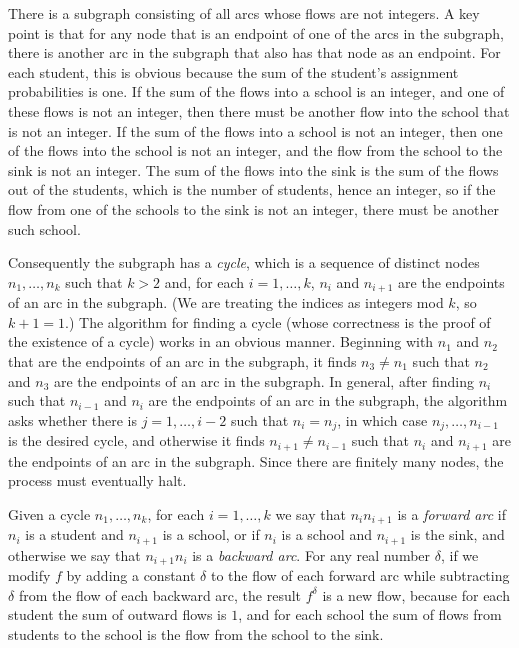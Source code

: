 \documentclass[12pt]{article}
\theoremstyle{definition}
\begin{document}
There is a subgraph consisting of all arcs whose flows are not
integers.  A key point is that for any node that is an endpoint of one
of the arcs in the subgraph, there is another arc in the subgraph
that also has that node as an endpoint.  For each student, this is
obvious because the sum of the student's assignment probabilities is
one.  If the sum of the flows into a school is an integer, and one of
these flows is not an integer, then there must be another flow into
the school that is not an integer.  If the sum of the flows into a
school is not an integer, then one of the flows into the school is not
an integer, and the flow from the school to the sink is not an
integer.  The sum of the flows into the sink is the sum of the flows
out of the students, which is the number of students, hence an
integer, so if the flow from one of the schools to the sink is not an
integer, there must be another such school.

Consequently the subgraph has a \emph{cycle}, which is a sequence of
distinct nodes $n_1, \ldots, n_k$ such that $k > 2$ and, for each $i =
1, \ldots, k$, $n_i$ and $n_{i+1}$ are the endpoints of an arc in the
subgraph.  (We are treating the indices as integers mod $k$, so $k + 1
= 1$.)  The algorithm for finding a cycle (whose correctness is the
proof of the existence of a cycle) works in an obvious manner.
Beginning with $n_1$ and $n_2$ that are the endpoints of an arc in the
subgraph, it finds $n_3 \ne n_1$ such that $n_2$ and $n_3$ are the
endpoints of an arc in the subgraph.  In general, after finding $n_i$
such that $n_{i-1}$ and $n_i$ are the endpoints of an arc in the
subgraph, the algorithm asks whether there is $j = 1, \ldots, i-2$
such that $n_i = n_j$, in which case $n_j, \ldots, n_{i-1}$ is the
desired cycle, and otherwise it finds $n_{i+1} \ne n_{i-1}$ such that
$n_i$ and $n_{i+1}$ are the endpoints of an arc in the subgraph.
Since there are finitely many nodes, the process must eventually halt.

Given a cycle $n_1, \ldots, n_k$, for each $i = 1, \ldots, k$ we say
that $n_in_{i+1}$ is a \emph{forward arc} if $n_i$ is a student and
$n_{i+1}$ is a school, or if $n_i$ is a school and $n_{i+1}$ is the
sink, and otherwise we say that $n_{i+1}n_i$ is a \emph{backward arc}.
For any real number $\delta$, if we modify $f$ by adding a constant
$\delta$ to the flow of each forward arc while subtracting $\delta$
from the flow of each backward arc, the result $f^\delta$ is a new
flow, because for each student the sum of outward flows is $1$, and
for each school the sum of flows from students to the school is the
flow from the school to the sink.
\end{document}
